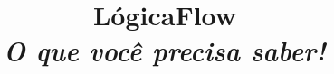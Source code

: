 \documentclass[twocolumn, letterpaper]{scrartcl}
\begin{document}
    \title{\color{triton_blue}LógicaFlow\\ \textit{O que você precisa saber!}}
    \date{}

	\maketitle


    
    
    
    
\end{document}
